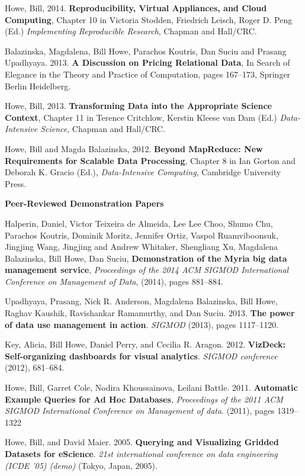 \begin{bulletlist}

\item Howe, Bill, 2014. \textbf{Reproducibility, Virtual Appliances, and Cloud Computing}, 
Chapter 10 in Victoria Stodden, Friedrich Leisch, Roger D. Peng (Ed.) 
\emph{Implementing Reproducible Research}, Chapman and Hall/CRC.

\item Balazinska, Magdalena, Bill Howe, Parachos Koutris, Dan Suciu and Prasang Upadhyaya. 2013. 
\textbf{A Discussion on Pricing Relational Data}, In Search of Elegance in the Theory and Practice of Computation, pages 167--173, Springer Berlin Heidelberg.

\item Howe, Bill, 2013. 
\textbf{Transforming Data into the Appropriate Science Context}, Chapter 11 in Terence Critchlow, Kerstin Kleese van Dam (Ed.) \emph{Data-Intensive Science}, 
Chapman and Hall/CRC.

\item Howe, Bill and Magda Balazinska, 2012. 
\textbf{Beyond MapReduce: New Requirements for Scalable Data Processing}, Chapter 8 in Ian Gorton and Deborah K. Gracio (Ed.), \emph{Data-Intensive Computing}, Cambridge University Press.

\end{bulletlist}

{\bf Peer-Reviewed Demonstration Papers}
\begin{bulletlist}

\item Halperin, Daniel, Victor Teixeira de Almeida, Lee Lee Choo, Shumo Chu, 
Parachos Koutris, Dominik Moritz, Jennifer Ortiz, Vaspol Ruamviboonsuk, Jingjing Wang, 
Jingjing and Andrew Whitaker, Shengliang Xu, Magdalena Balazinska, Bill Howe, Dan Suciu, 
\textbf{Demonstration of the Myria big data management service},
\emph{Proceedings of the 2014 ACM SIGMOD International Conference on Management of Data},
(2014), pages 881--884.

\item Upadhyaya, Prasang, Nick R. Anderson, Magdalena Balazinska, Bill
Howe, Raghav Kaushik, Ravishankar Ramamurthy, and Dan Suciu. 2013. 
\textbf{The power of data use management in action}. \emph{SIGMOD} (2013),
pages 1117--1120. 

\item Key, Alicia, Bill Howe, Daniel
Perry, and Cecilia R. Aragon. 2012. 
\textbf{VizDeck: Self-organizing dashboards for visual analytics}. 
\emph{SIGMOD conference} (2012), 681--684.

\item Howe, Bill, Garret Cole, Nodira Khoussainova, Leilani Battle. 2011.
\textbf{Automatic Example Queries for Ad Hoc Databases},
\emph{Proceedings of the 2011 ACM SIGMOD International Conference on Management of data}. (2011), pages 1319--1322

\item Howe, Bill, and David Maier. 2005. 
\textbf{Querying and Visualizing Gridded Datasets for eScience}. \emph{21st international conference on
data engineering (ICDE '05) (demo)} (Tokyo, Japan, 2005). 

\end{bulletlist}

